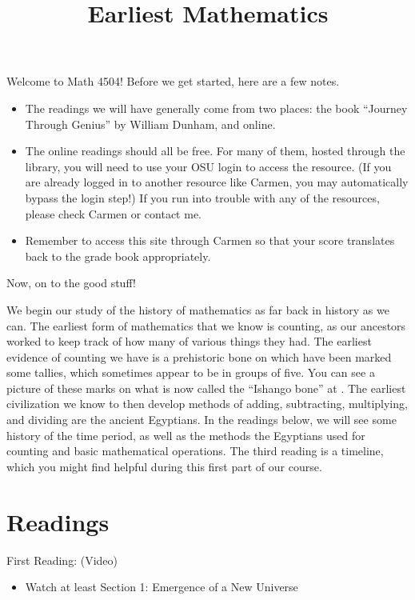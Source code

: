 \documentclass{ximera}
\title{Earliest Mathematics}
\begin{document}
\begin{abstract}
\end{abstract}
\maketitle

Welcome to Math 4504! Before we get started, here are a few notes.
\begin{itemize}
	\item The readings we will have generally come from two places: the book ``Journey Through Genius'' by William Dunham, and online.
	\item The online readings should all be free.  For many of them, hosted through the library, you will need to use your OSU login to access the resource. (If you are already logged in to another resource like Carmen, you may automatically bypass the login step!)  If you run into trouble with any of the resources, please check Carmen or contact me.
	\item Remember to access this site through Carmen so that your score translates back to the grade book appropriately.
\end{itemize}

Now, on to the good stuff!


We begin our study of the history of mathematics as far back in history as we can.  The earliest form of mathematics that we know is counting, as our 
ancestors worked to keep track of how many of various things they had. The earliest evidence of counting we have is a prehistoric bone on which have been 
marked some tallies, which sometimes appear to be in groups of five.  You can see a picture of these marks on what is now called the ``Ishango bone'' 
at .  The earliest civilization we know to then develop methods of 
adding, subtracting, multiplying, and dividing are the ancient Egyptians.  In the readings below, we will see some history of the time period, as well as 
the methods the Egyptians used for counting and basic mathematical operations.  The third reading is a timeline, which you might find helpful during 
this first part of our course.




\section{Readings}

First Reading: (Video) 
\begin{itemize}
\item Watch at least Section 1: Emergence of a New Universe
\end{itemize}
\end{document}
